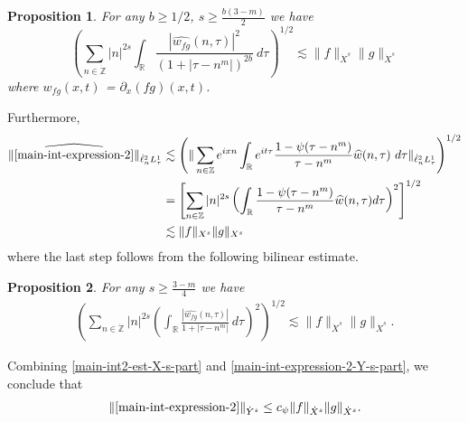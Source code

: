 \documentclass[12pt,reqno]{amsart}
\numberwithin{equation}{section}  %
\numberwithin{figure}{section}
\newcommand{\rr}{\mathbb{R}}
\newcommand{\zz}{\mathbb{Z}}
\newcommand{\zzdot}{\dot{\zz}}
\newcommand{\wh}{\widehat}
\newcommand{\p}{\partial}
\theoremstyle{plain}
\newtheorem{proposition}{Proposition}
\theoremstyle{definition}
\theoremstyle{remark}
\begin{document}
%
%
%
%
%
%
\begin{proposition}
	\label{prop:prim-bilin-est}
	For any $b \ge 1/2$, $s \ge \frac{b(3-m)}{2}$ we have
	\begin{equation}
		\left( \sum_{n \in \dot{\zz}} |n|^{2s} \int_\rr
		\frac{|\wh{w_{fg}}(n, \tau) |^2}{\left (1+ |\tau - 
		n^{m}| \right )^{2b}} 
		 \ d \tau 
		\right)^{1/2}
		\lesssim \|f\|_{\dot{X}^s} \|g\|_{\dot{X}^s}
	\end{equation}
	where $w_{fg}(x,t)$ = $\p_x(fg)(x,t)$.
\end{proposition}
%
Furthermore,
%
%
%
%
\begin{equation}
	\label{main-int-expression-2-Y-s-part}
	\begin{split}
		\|\wh{\eqref{main-int-expression-2}} \|_{\dot{\ell}^2_n L^1_\tau}
		& \lesssim \left( \| \sum_{n \in \zz} e^{ixn} \int_\rr 
		e^{it \tau} \frac{ 1 - \psi (\tau - n^{m} ) 
		}{\tau - n^{m}} \wh{w}(n, \tau) \ 
		d \tau\|_{\dot{\ell}^2_n L^1_\tau} \right)^{1/2}
		\\
		& = \left[ \sum_{n \in \zz}|n|^{2s} \left(
		\int_{\rr}\frac{1 - \psi(\tau - n^{m})}{\tau - n^{m}} \wh{w}(n, \tau) d
		\tau \right)^{2} \right]^{1/2}
		\\
		& \lesssim \|f\|_{X^s} \|g\|_{X^s}
	\end{split}
\end{equation}
%
%
where the last step follows from the following bilinear estimate.
%
%
%
%
%
%
%
\begin{proposition}
\label{prop:bilinear-estimate2}
For any $s \ge \frac{3-m}{4}$ we have
%
%
\begin{equation}
	\label{trilinear-estimate2}
	\begin{split}
		\left( \sum_{n \in \zzdot} |n|^{2s}  \left ( \int_\rr 
		\frac{|\wh{w_{fg}}(n, \tau) |}{1 + | \tau - n^{m } |}
		 \ d\tau \right)^2  \right)^{1/2} \lesssim \|f\|_{\dot{X}^s} \|g\|_{\dot{X}^s}.
	\end{split}
\end{equation}
\end{proposition}
%
%
Combining \eqref{main-int2-est-X-s-part} and
\eqref{main-int-expression-2-Y-s-part}, we conclude that
%
%
%
%
\begin{equation}
	\label{main-int2-est}
	\begin{split}
		\|\eqref{main-int-expression-2}\|_{\dot{Y}^s} \le c_{\psi}\|f\|_{\dot{X}^s} \|g\|_{\dot{X}^s}.
	\end{split}
\end{equation}
%
%
\end{document}
